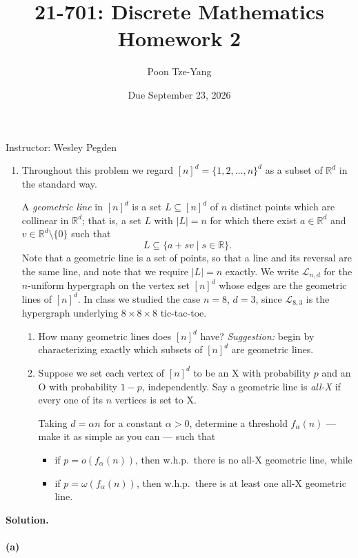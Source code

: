 \documentclass[11pt,letterpaper]{article}
\title{21-701: Discrete Mathematics \\ Homework 2}
\author{Poon Tze-Yang}
\date{Due September 23, 2026}
\theoremstyle{definition}
\newcommand{\reals}{\mathbb{R}}
\newcommand{\calL}{\mathcal{L}}
\newcommand{\solution}{\medskip\noindent\textbf{Solution.}\par\medskip}
\begin{document}
\maketitle

\noindent Instructor: Wesley Pegden

\begin{enumerate}
\item Throughout this problem we regard $[n]^d = \{1,2,\dots,n\}^d$ as a subset of $\reals^d$ in the standard way.

A \emph{geometric line} in $[n]^d$ is a set $L\subseteq[n]^d$ of $n$ distinct points which are collinear in $\reals^d$; that is, a set $L$ with $|L| = n$ for which there exist $a\in\reals^d$ and $v\in\reals^d\setminus\{0\}$ such that
\[
L \subseteq \{a + sv \mid s\in\reals\}.
\]
Note that a geometric line is a set of points, so that a line and its reversal are the same line, and note that we require $|L| = n$ exactly. We write $\calL_{n,d}$ for the $n$-uniform hypergraph on the vertex set $[n]^d$ whose edges are the geometric lines of $[n]^d$. In class we studied the case $n=8$, $d=3$, since $\calL_{8,3}$ is the hypergraph underlying $8\times8\times8$ tic-tac-toe.
\begin{enumerate}
\item How many geometric lines does $[n]^d$ have? \emph{Suggestion:} begin by characterizing exactly which subsets of $[n]^d$ are geometric lines.
\item Suppose we set each vertex of $[n]^d$ to be an X with probability $p$ and an O with probability $1-p$, independently. Say a geometric line is \emph{all-X} if every one of its $n$ vertices is set to X.

Taking $d = \alpha n$ for a constant $\alpha>0$, determine a threshold $f_\alpha(n)$ --- make it as simple as you can --- such that
\begin{itemize}
\item if $p = o(f_\alpha(n))$, then w.h.p.\ there is no all-X geometric line, while
\item if $p = \omega(f_\alpha(n))$, then w.h.p.\ there is at least one all-X geometric line.
\end{itemize}
\end{enumerate}
\end{enumerate}

\solution
\paragraph{(a)}
\end{document}
